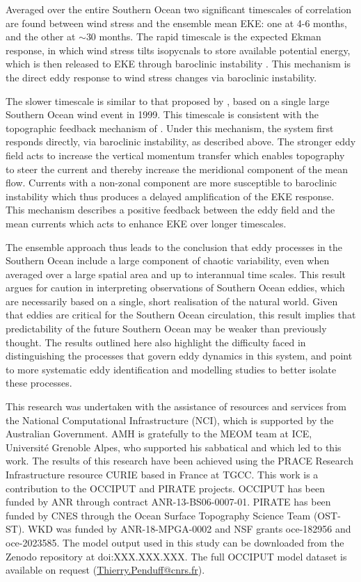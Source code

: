 \documentclass[linenumbers]{agujournal2019}
\begin{document}
Averaged over the entire Southern Ocean two significant timescales of correlation are found between wind stress and the ensemble mean EKE: one at 4-6 months, and the other at $\sim$30 months.
The rapid timescale is the expected Ekman response, in which wind stress tilts isopycnals to store available potential energy, which is then released to EKE through baroclinic instability \citep[e.g.][]{Sinha2016}.
This mechanism is the direct eddy response to wind stress changes via baroclinic instability.

The slower timescale is similar to that proposed by \citet{Meredith-Hogg-2006}, based on a single large Southern Ocean wind event in 1999.
This timescale is consistent with the  topographic feedback mechanism of \citet{Hogg-Blundell-2006}.
Under this mechanism, the system first responds directly, via baroclinic instability, as described above. 
The stronger eddy field acts to increase the vertical momentum transfer which enables topography to steer the current and thereby increase the meridional component of the mean flow. 
Currents with a non-zonal component are more susceptible to baroclinic instability which thus produces a delayed amplification of the EKE response.
This mechanism describes a positive feedback between the eddy field and the mean currents which acts to enhance EKE over longer timescales.
 
The ensemble approach thus leads to the conclusion that eddy processes in the Southern Ocean include a large component of chaotic variability, even when averaged over a large spatial area and up to interannual time scales.
This result argues for caution in interpreting observations of Southern Ocean eddies, which are necessarily based on a single, short realisation of the natural world.
Given that eddies are critical for the Southern Ocean circulation, this result implies that predictability of the future Southern Ocean may be weaker than previously thought.
The results outlined here also highlight the difficulty faced in distinguishing the processes that govern eddy dynamics in this system, and point to more systematic eddy identification and modelling studies to better isolate these processes.
 


\acknowledgments
This research was undertaken with the assistance of resources and services from the National Computational Infrastructure (NCI), which is supported by the Australian Government.
AMH is gratefully to the MEOM team at ICE, Universit{\'e} Grenoble Alpes, who supported his sabbatical and which led to this work. 
The results of this research have been achieved using the PRACE Research Infrastructure resource CURIE based in France at TGCC. 
This work is a contribution to the OCCIPUT and PIRATE projects. 
OCCIPUT has been funded by ANR through contract ANR-13-BS06-0007-01. 
PIRATE has been funded by CNES through the Ocean Surface Topography Science Team (OST-ST). 
WKD was funded by ANR-18-MPGA-0002 and NSF grants oce-182956 and oce-2023585.
{\color{red}The model output used in this study can be downloaded from the Zenodo repository at doi:XXX.XXX.XXX.}
The full OCCIPUT model dataset is available on request (\href{mailto:Thierry.Penduff@cnrs.fr}{Thierry.Penduff@cnrs.fr}).


\end{document}
